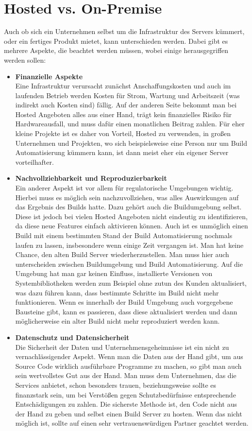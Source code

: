 \section{Hosted vs. On-Premise}
Auch ob sich ein Unternehmen selbst um die Infrastruktur des Servers kümmert, oder ein fertiges Produkt mietet, kann unterschieden werden. Dabei gibt es mehrere Aspekte, die beachtet werden müssen, wobei einige herausgegriffen werden sollen:
\begin{itemize}
	\item \textbf{Finanzielle Aspekte}\\
	Eine Infrastruktur verursacht zunächst Anschaffungskosten und auch im laufenden Betrieb werden Kosten für Strom, Wartung und Arbeitszeit (was indirekt auch Kosten sind) fällig. Auf der anderen Seite bekommt man bei Hosted Angeboten alles aus einer Hand, trägt kein finanzielles Risiko für Hardwareausfall, und muss dafür einen monatlichen Beitrag zahlen. Für eher kleine Projekte ist es daher von Vorteil, Hosted zu verwenden, in großen Unternehmen und Projekten, wo sich beispielsweise eine Person nur um Build Automatisierung kümmern kann, ist dann meist eher ein eigener Server vorteilhafter.
	\item \textbf{Nachvollziehbarkeit und Reproduzierbarkeit}\\
	Ein anderer Aspekt ist vor allem für regulatorische Umgebungen wichtig. Hierbei muss es möglich sein nachzuvollziehen, was alles Auswirkungen auf das Ergebnis des Builds hatte. Dazu gehört auch die Buildumgebung selbst. Diese ist jedoch bei vielen Hosted Angeboten nicht eindeutig zu identifizieren, da diese neue Features einfach aktivieren können. Auch ist es unmöglich einen Build mit einem bestimmten Stand der Build Automatisierung nochmals laufen zu lassen, insbesondere wenn einige Zeit vergangen ist. Man hat keine Chance, den alten Build Server wiederherzustellen. Man muss hier auch unterscheiden zwischen Buildumgebung und Build Automatisierung. Auf die Umgebung hat man gar keinen Einfluss, installierte Versionen von Systembibliotheken werden zum Beispiel ohne zutun des Kunden aktualisiert, was dazu führen kann, dass bestimmte Schritte im Build nicht mehr funktionieren. Wenn es innerhalb der Build Umgebung auch vorgegebene Bausteine gibt, kann es passieren, dass diese aktualisiert werden und dann möglicherweise ein alter Build nicht mehr reproduziert werden kann.
	\item \textbf{Datenschutz und Datensicherheit}\\
	Die Sicherheit der Daten und Unternehmensgeheimnisse ist ein nicht zu vernachlässigender Aspekt. Wenn man die Daten aus der Hand gibt, um aus Source Code wirklich ausführbare Programme zu machen, so gibt man auch sein wertvollstes Gut aus der Hand. Man muss dem Unternehmen, das die Services anbietet, schon besonders trauen, beziehungsweise sollte es finanzstark sein, um bei Verstößen gegen Schutzbedürfnisse entsprechende Entschädigungen zu zahlen. Die sicherste Methode ist, den Code nicht aus der Hand zu geben und selbst einen Build Server zu hosten. Wenn das nicht möglich ist, sollte auf einen sehr vertrauenswürdigen Partner geachtet werden.
\end{itemize}
